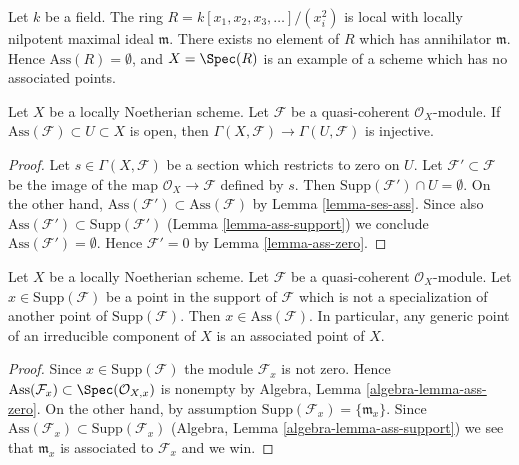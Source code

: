\begin{example}
\label{example-no-associated-prime}
Let $k$ be a field. The ring $R = k[x_1, x_2, x_3, \ldots]/(x_i^2)$
is local with locally nilpotent maximal ideal $\mathfrak m$.
There exists no element of $R$ which has annihilator $\mathfrak m$.
Hence $\text{Ass}(R) = \emptyset$, and $X = \Spec(R)$
is an example of a scheme which has no associated points.
\end{example}

\begin{lemma}
\label{lemma-restriction-injective-open-contains-ass}
Let $X$ be a locally Noetherian scheme. Let $\mathcal{F}$ be a quasi-coherent
$\mathcal{O}_X$-module. If $\text{Ass}(\mathcal{F}) \subset U \subset X$
is open, then $\Gamma(X, \mathcal{F}) \to \Gamma(U, \mathcal{F})$
is injective.
\end{lemma}

\begin{proof}
Let $s \in \Gamma(X, \mathcal{F})$ be a section which restricts to zero on $U$.
Let $\mathcal{F}' \subset \mathcal{F}$ be the image of the map
$\mathcal{O}_X \to \mathcal{F}$ defined by $s$. Then
$\text{Supp}(\mathcal{F}') \cap U = \emptyset$. On the other hand,
$\text{Ass}(\mathcal{F}') \subset \text{Ass}(\mathcal{F})$
by Lemma \ref{lemma-ses-ass}. Since also
$\text{Ass}(\mathcal{F}') \subset \text{Supp}(\mathcal{F}')$
(Lemma \ref{lemma-ass-support}) we conclude
$\text{Ass}(\mathcal{F}') = \emptyset$.
Hence $\mathcal{F}' = 0$ by Lemma \ref{lemma-ass-zero}.
\end{proof}

\begin{lemma}
\label{lemma-minimal-support-in-ass}
Let $X$ be a locally Noetherian scheme.
Let $\mathcal{F}$ be a quasi-coherent $\mathcal{O}_X$-module.
Let $x \in \text{Supp}(\mathcal{F})$ be a point in the support
of $\mathcal{F}$ which is not a specialization of another point of
$\text{Supp}(\mathcal{F})$. Then $x \in \text{Ass}(\mathcal{F})$.
In particular, any generic point of an irreducible component of $X$
is an associated point of $X$.
\end{lemma}

\begin{proof}
Since $x \in \text{Supp}(\mathcal{F})$ the module $\mathcal{F}_x$
is not zero. Hence
$\text{Ass}(\mathcal{F}_x) \subset \Spec(\mathcal{O}_{X, x})$
is nonempty by
Algebra, Lemma \ref{algebra-lemma-ass-zero}.
On the other hand, by assumption
$\text{Supp}(\mathcal{F}_x) = \{\mathfrak m_x\}$.
Since
$\text{Ass}(\mathcal{F}_x) \subset \text{Supp}(\mathcal{F}_x)$
(Algebra, Lemma \ref{algebra-lemma-ass-support})
we see that $\mathfrak m_x$ is associated to $\mathcal{F}_x$
and we win.
\end{proof}

